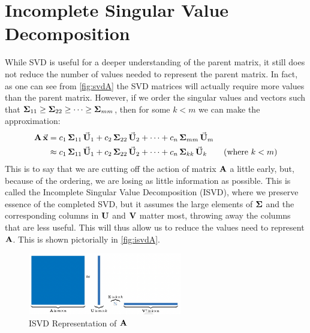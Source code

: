 
\section{Incomplete Singular Value Decomposition}  \label{sec:isvd}
While SVD is useful for a deeper understanding of the parent matrix, it still does not reduce the number of values needed to represent the parent matrix. In fact, as one can see from \autoref{fig:svdA} the SVD matrices will actually require more values than the parent matrix. However, if we order the singular values and vectors such that $\operatorname{\mathbf{\Sigma}}_{11} \ge  \operatorname{\mathbf{\Sigma}}_{22} \ge \dots \ge \operatorname{\mathbf{\Sigma}}_{mm}$, then for some $k<m$ we can make the approximation:
 \begin{align*}
     \operatorname{\mathbf{A}}\vec{\mathbf{x}} &= c_1\operatorname{\mathbf{\Sigma}}_{11}\vec{\mathbf{U}}_1 +  c_2\operatorname{\mathbf{\Sigma}}_{22}\vec{\mathbf{U}}_2 + \dots + c_n\operatorname{\mathbf{\Sigma}}_{mm}\vec{\mathbf{U}}_m \\
     &\approx c_1\operatorname{\mathbf{\Sigma}}_{11}\vec{\mathbf{U}}_1 +  c_2\operatorname{\mathbf{\Sigma}}_{22}\vec{\mathbf{U}}_2 + \dots + c_n\operatorname{\mathbf{\Sigma}}_{kk}\vec{\mathbf{U}}_k \tag{where $k < m$} 
 \end{align*}
This is to say that we are cutting off the action of matrix $\operatorname{\mathbf{A}}$ a little early, but, because of the ordering, we are losing as little information as possible. This is called the Incomplete Singular Value Decomposition (ISVD), where we preserve essence of the completed SVD, but it assumes the large  elements of $\operatorname{\mathbf{\Sigma}}$ and the corresponding columns in $\operatorname{\mathbf{U}}$ and $\operatorname{\mathbf{V}}$ matter most, throwing away the columns that are less useful. This will thus allow us to reduce the values need to represent $\operatorname{\mathbf{A}}$. This is shown pictorially in \autoref{fig:isvdA}.
\begin{figure}[H]
    \centering
    \includegraphics[width=0.6\textwidth]{./imgs/ISVD.jpg}
    \caption{ISVD Representation of $\operatorname{\mathbf{A}}$}
    \label{fig:isvdA}
\end{figure}
